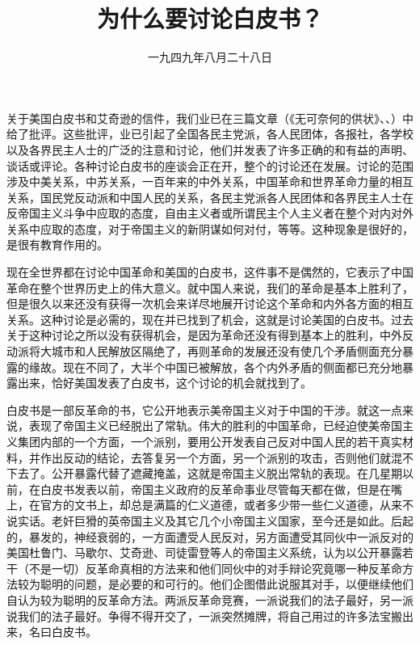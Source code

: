 
\title{为什么要讨论白皮书？}
\date{一九四九年八月二十八日}
\maketitle


关于美国白皮书和艾奇逊的信件，我们业已在三篇文章（《无可奈何的供状》、、）中给了批评。这些批评，业已引起了全国各民主党派，各人民团体，各报社，各学校以及各界民主人士的广泛的注意和讨论，他们并发表了许多正确的和有益的声明、谈话或评论。各种讨论白皮书的座谈会正在开，整个的讨论还在发展。讨论的范围涉及中美关系，中苏关系，一百年来的中外关系，中国革命和世界革命力量的相互关系，国民党反动派和中国人民的关系，各民主党派各人民团体和各界民主人士在反帝国主义斗争中应取的态度，自由主义者或所谓民主个人主义者在整个对内对外关系中应取的态度，对于帝国主义的新阴谋如何对付，等等。这种现象是很好的，是很有教育作用的。

现在全世界都在讨论中国革命和美国的白皮书，这件事不是偶然的，它表示了中国革命在整个世界历史上的伟大意义。就中国人来说，我们的革命是基本上胜利了，但是很久以来还没有获得一次机会来详尽地展开讨论这个革命和内外各方面的相互关系。这种讨论是必需的，现在并已找到了机会，这就是讨论美国的白皮书。过去关于这种讨论之所以没有获得机会，是因为革命还没有得到基本上的胜利，中外反动派将大城市和人民解放区隔绝了，再则革命的发展还没有使几个矛盾侧面充分暴露的缘故。现在不同了，大半个中国已被解放，各个内外矛盾的侧面都已充分地暴露出来，恰好美国发表了白皮书，这个讨论的机会就找到了。

白皮书是一部反革命的书，它公开地表示美帝国主义对于中国的干涉。就这一点来说，表现了帝国主义已经脱出了常轨。伟大的胜利的中国革命，已经迫使美帝国主义集团内部的一个方面，一个派别，要用公开发表自己反对中国人民的若干真实材料，并作出反动的结论，去答复另一个方面，另一个派别的攻击，否则他们就混不下去了。公开暴露代替了遮藏掩盖，这就是帝国主义脱出常轨的表现。在几星期以前，在白皮书发表以前，帝国主义政府的反革命事业尽管每天都在做，但是在嘴上，在官方的文书上，却总是满篇的仁义道德，或者多少带一些仁义道德，从来不说实话。老奸巨猾的英帝国主义及其它几个小帝国主义国家，至今还是如此。后起的，暴发的，神经衰弱的，一方面遭受人民反对，另方面遭受其同伙中一派反对的美国杜鲁门、马歇尔、艾奇逊、司徒雷登等人的帝国主义系统，认为以公开暴露若干（不是一切）反革命真相的方法来和他们同伙中的对手辩论究竟哪一种反革命方法较为聪明的问题，是必要的和可行的。他们企图借此说服其对手，以便继续他们自认为较为聪明的反革命方法。两派反革命竞赛，一派说我们的法子最好，另一派说我们的法子最好。争得不得开交了，一派突然摊牌，将自己用过的许多法宝搬出来，名曰白皮书。

